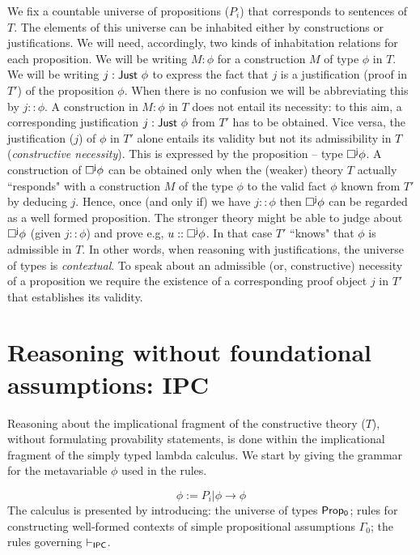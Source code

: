 We fix a countable universe of propositions ($P_i$) that corresponds to  sentences of $T$. The elements of this universe can be inhabited either by constructions or justifications. We  will need, accordingly, two kinds of inhabitation relations for each proposition. We will be writing $M:\phi$ for a construction $M$ of type $\phi$ in $T$. We will be writing {$j: {\sf  Just}\  \phi$}  to express the fact that  {$j$} is a justification (proof in $T'$) of the proposition $\phi$. When there is no confusion we will be abbreviating this by {\sf $j:: \phi$}. A construction in $M:\phi$ in $T$ does not entail its necessity: to this aim, a corresponding justification {$j: {\sf  Just}\  \phi$} from $T'$ has to be obtained. Vice versa, the justification ($j$) of $\phi$ in $T'$ alone entails its validity but not its admissibility in $T$ (\textit{constructive  necessity}). This is expressed by the proposition -- type ${\sf \Box^{j}\phi}$. A construction of ${\sf \Box^{j}\phi}$ can be obtained only when the (weaker) theory $T$ actually ``responds" with a construction $M$ of the type $\phi$ to the valid fact $\phi$ known from $T'$ by deducing $j$. Hence, once (and only if) we have $j:: \phi$ then ${\sf\Box^{j}\phi}$ can be regarded as a well formed proposition. The  stronger theory might be able to judge about ${\sf\Box^{j}\phi}$ (given $j::\phi$) and prove e.g, $u::{\sf\Box^{j}\phi}$. In that case $T'$ ``knows"  that $\phi$ is admissible in $T$. In other words, when reasoning with justifications, the universe of types  is \textit{contextual}. To speak about  an admissible (or, constructive) necessity of a proposition we require the existence of a corresponding proof object $j$ in $T'$ that establishes its validity. 

\section{Reasoning without foundational assumptions: {\sf IPC}}\label{sec:IPC}

Reasoning about the implicational fragment of the constructive theory ($T$), without formulating provability statements, is done within the implicational fragment of the simply typed lambda calculus. We start by giving the grammar for the metavariable $\phi$ used in the rules.

\begin{displaymath}
\phi:= P_i | \phi \rightarrow \phi
\end{displaymath}
%
The calculus is presented by introducing: the universe of types {$\sf Prop_0$}; rules for constructing well-formed contexts of simple propositional assumptions $\Gamma_0$; the rules governing $\vdash_{{\sf IPC}}$.


